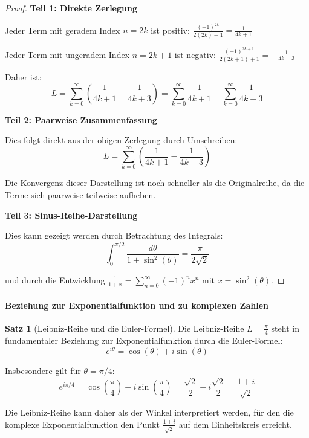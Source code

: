 \documentclass[a4paper, 12pt, twoside, openright]{report}
\theoremstyle{definition}
\theoremstyle{definition}
\newtheorem{satz}{Satz}[chapter]
\begin{document}
\begin{proof}
\textbf{Teil 1: Direkte Zerlegung}

Jeder Term mit geradem Index $n = 2k$ ist positiv: $\frac{(-1)^{2k}}{2(2k)+1} = \frac{1}{4k+1}$

Jeder Term mit ungeradem Index $n = 2k+1$ ist negativ: $\frac{(-1)^{2k+1}}{2(2k+1)+1} = -\frac{1}{4k+3}$

Daher ist:
\begin{equation}
L = \sum_{k=0}^{\infty} \left( \frac{1}{4k+1} - \frac{1}{4k+3} \right) = \sum_{k=0}^{\infty} \frac{1}{4k+1} - \sum_{k=0}^{\infty} \frac{1}{4k+3}
\end{equation}

\textbf{Teil 2: Paarweise Zusammenfassung}

Dies folgt direkt aus der obigen Zerlegung durch Umschreiben:
\begin{equation}
L = \sum_{k=0}^{\infty} \left( \frac{1}{4k+1} - \frac{1}{4k+3} \right)
\end{equation}

Die Konvergenz dieser Darstellung ist noch schneller als die Originalreihe, da die Terme sich paarweise teilweise aufheben.

\textbf{Teil 3: Sinus-Reihe-Darstellung}

Dies kann gezeigt werden durch Betrachtung des Integrals:
\begin{equation}
\int_0^{\pi/2} \frac{d\theta}{1 + \sin^2(\theta)} = \frac{\pi}{2\sqrt{2}}
\end{equation}

und durch die Entwicklung $\frac{1}{1+x} = \sum_{n=0}^{\infty} (-1)^n x^n$ mit $x = \sin^2(\theta)$.
\end{proof}

\paragraph{Beziehung zur Exponentialfunktion und zu komplexen Zahlen}

\begin{satz}[Leibniz-Reihe und die Euler-Formel]
Die Leibniz-Reihe $L = \frac{\pi}{4}$ steht in fundamentaler Beziehung zur Exponentialfunktion durch die Euler-Formel:
\begin{equation}
e^{i\theta} = \cos(\theta) + i\sin(\theta)
\end{equation}

Insbesondere gilt für $\theta = \pi/4$:
\begin{equation}
e^{i\pi/4} = \cos\left(\frac{\pi}{4}\right) + i\sin\left(\frac{\pi}{4}\right) = \frac{\sqrt{2}}{2} + i\frac{\sqrt{2}}{2} = \frac{1+i}{\sqrt{2}}
\end{equation}

Die Leibniz-Reihe kann daher als der Winkel interpretiert werden, für den die komplexe Exponentialfunktion den Punkt $\frac{1+i}{\sqrt{2}}$ auf dem Einheitskreis erreicht.
\end{satz}
\end{document}
